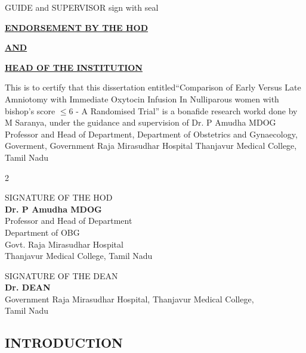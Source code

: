 \documentclass[14pt]{extarticle}
\def\name{M Saranya}
\def\study{Comparison of Early Versus Late Amniotomy with Immediate Oxytocin Infusion In Nulliparous women with bishop’s score $\leq$6 - A Randomised Trial}
\def\guide{Dr. P Amudha MDOG}
\def\guidedes{Professor and Head of Department}
\begin{document}
\vspace{30mm}
\begin{flushright}
\begin{bfseries}
    GUIDE and SUPERVISOR sign with seal
\end{bfseries}
\end{flushright}

\newpage

\null

\centerline{\underline{{\large\textbf{ENDORSEMENT BY THE HOD }}}}
\vspace{3mm}
\centerline{\underline{{\large\textbf{AND }}}}
\vspace{3mm}
\centerline{\underline{{\large\textbf{HEAD OF THE INSTITUTION}}}}

\vspace{7mm}
This is to certify that this dissertation entitled``\study'' is a
bonafide research workd done by \name, under the guidance and supervision of
\guide{} \guidedes, Department of Obstetrics and Gynaecology, Goverment,
Government Raja Mirasudhar Hospital Thanjavur Medical College, Tamil Nadu

\vspace{30mm}


\begin{multicols}{2}
\begin{flushleft}
    {\small SIGNATURE OF THE HOD\\[5pt]\textbf{\guide} \\[5pt]\guidedes \\ Department of OBG\\Govt. Raja Mirasudhar Hospital\\ Thanjavur Medical College, Tamil Nadu} 
\end{flushleft}

\begin{flushleft}
    {\small SIGNATURE OF THE DEAN\\[5pt]\textbf{Dr. DEAN} \\ Government Raja
    Mirasudhar Hospital, Thanjavur Medical College, \\ Tamil Nadu} 
\end{flushleft}
\end{multicols}


\newpage
\null

\centering\tableofcontents

\newpage
\justifying
{}
\setcounter{page}{1}

\null
\vfill
\begin{flushright}
\raggedleft\section{INTRODUCTION}
\end{flushright}
\hrulefill
\end{document}
